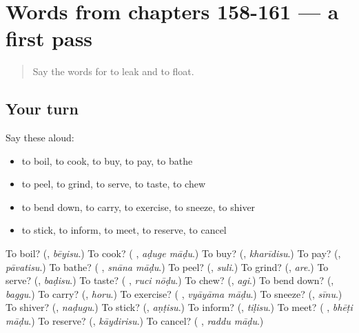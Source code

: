 \section[(dialogue)]{Words from chapters 158-161 — a first pass}

\label{lesson:KA-R166-first-pass-words-from-chapters-158-161}



\begin{quote}
Say the words for to leak and to float.
\end{quote}

\subsection*{Your turn}
Say these aloud:

\begin{itemize}
\raggedright
  \item to boil, to cook, to buy, to pay, to bathe
  \item to peel, to grind, to serve, to taste, to chew
  \item to bend down, to carry, to exercise, to sneeze, to shiver
  \item to stick, to inform, to meet, to reserve, to cancel
\end{itemize}

\begin{tcolorbox}[breakable,colback=teal!4,colframe=teal!35!black,title={Before you move on}]
To boil? (\textbf{}, \emph{bēyisu}.) To cook? (\textbf{ }, \emph{aḍuge māḍu}.) To buy? (\textbf{}, \emph{kharīdisu}.) To pay? (\textbf{}, \emph{pāvatisu}.) To bathe? (\textbf{ }, \emph{snāna māḍu}.) To peel? (\textbf{}, \emph{suli}.) To grind? (\textbf{}, \emph{are}.) To serve? (\textbf{}, \emph{baḍisu}.) To taste? (\textbf{ }, \emph{ruci nōḍu}.) To chew? (\textbf{}, \emph{agi}.) To bend down? (\textbf{}, \emph{baggu}.) To carry? (\textbf{}, \emph{horu}.) To exercise? (\textbf{ }, \emph{vyāyāma māḍu}.) To sneeze? (\textbf{}, \emph{sīnu}.) To shiver? (\textbf{}, \emph{naḍugu}.) To stick? (\textbf{}, \emph{aṇṭisu}.) To inform? (\textbf{}, \emph{tiḷisu}.) To meet? (\textbf{ }, \emph{bhēṭi māḍu}.) To reserve? (\textbf{}, \emph{kāydirisu}.) To cancel? (\textbf{ }, \emph{raddu māḍu}.)
\end{tcolorbox}
